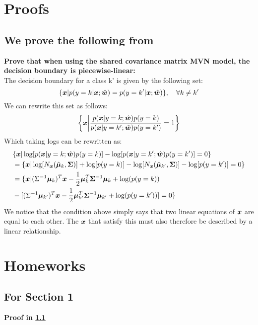 \newpage
\begin{appendices}


\section{Proofs}

\subsection{We prove the following from } \label{Proofs:linear-decision-boundary}
\textbf{Prove that when using the shared covariance matrix MVN model, the decision boundary is piecewise-linear:}\\
The decision boundary for a class k' is given by the following set:
\begin{equation}
    \{\bm{x} | p(y=k| \bm{x} ; \hat{\bm{w}}) = p(y=k' | \bm{x}; \hat{\bm{w}})\}, \quad \forall k \neq k'
\end{equation}
We can rewrite this set as follows:
\begin{equation}
    \left\{\bm{x} \middle| \frac{p(\bm{x}|y=k;\hat{\bm{w}}) p(y=k)}{p(\bm{x}|y=k';\hat{\bm{w}}) p(y=k')} =1 \right\}
\end{equation}
Which taking logs can be rewritten as:
\begin{align}
    &{} \{ \bm{x} | \log[p(\bm{x} | y=k;\hat{\bm{w}})p(y=k)] - \log[p(\bm{x} | y=k';\hat{\bm{w}})p(y=k')] =0 \} \\
    & = \{ \bm{x} | \log[N_{\bm{x}}(\hat{\bm{\mu}}_{k}, \bm{\Sigma})] + \log[p(y=k)] - \log[N_{\bm{x}}(\hat{\bm{\mu}}_{k'}, \bm{\Sigma})] - \log[p(y=k')] =0 \} \\
    &= \{ \bm{x} | (\Sigma^{-1} \bm{\mu}_{k})^{T} \bm{x} -\frac{1}{2} \bm{\mu}_{k}^{T} \bm{\Sigma}^{-1} \bm{\mu}_{k} + \log(p(y=k)) \\  &- [(\Sigma^{-1} \bm{\mu}_{k'})^{T} \bm{x} -\frac{1}{2} \bm{\mu}_{k'}^{T} \bm{\Sigma}^{-1} \bm{\mu}_{k'} + \log(p(y=k'))] = 0 \}
\end{align}
We notice that the condition above simply says that two linear equations of $\bm{x}$ are equal to each other. The $\bm{x}$ that satisfy this must also therefore be described by a linear relationship.


\newpage
\section{Homeworks}
\subsection{For Section 1}
\begin{question}
    \textbf{Proof in \cref{Proofs:linear-decision-boundary}}
\end{question}


\end{appendices}
